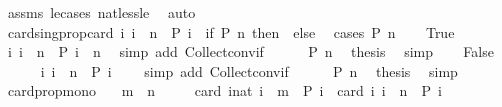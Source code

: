 \begin{isabellebody}
%
\isadelimproof
%
\endisadelimproof
%
\isatagproof
{}\isamarkupfalse%
\ assms\ le{\isacharunderscore}cases\ nat{\isacharunderscore}less{\isacharunderscore}le\ \isamarkupfalse%
\ auto%
\endisatagproof
{\isafoldproof}%
%
\isadelimproof
\isanewline
%
\endisadelimproof
\isanewline
{}\isamarkupfalse%
\ card{\isacharunderscore}sing{\isacharunderscore}prop{\isacharcolon}{\isacartoucheopen}card\ {\isacharbraceleft}i{\isachardot}\ i\ {\isacharequal}\ n\ {\isasymand}\ P\ i{\isacharbraceright}\ {\isacharequal}\ {\isacharparenleft}if\ P\ n\ then\ {}\ else\ {}{\isacharparenright}{\isacartoucheclose}\isanewline
%
\isadelimproof
%
\endisadelimproof
%
\isatagproof
{}\isamarkupfalse%
\ {\isacharparenleft}cases\ {\isacartoucheopen}P\ n{\isacartoucheclose}{\isacharparenright}\isanewline
\ \ \isamarkupfalse%
\ True\isanewline
\ \ \ \ \isamarkupfalse%
\ {\isacartoucheopen}{\isacharbraceleft}i{\isachardot}\ i\ {\isacharequal}\ n\ {\isasymand}\ P\ i{\isacharbraceright}\ {\isacharequal}\ {\isacharbraceleft}n{\isacharbraceright}{\isacartoucheclose}\ \isamarkupfalse%
\ {\isacharparenleft}simp\ add{\isacharcolon}\ Collect{\isacharunderscore}conv{\isacharunderscore}if{\isacharparenright}\isanewline
\ \ \ \ \isamarkupfalse%
\ {\isacartoucheopen}P\ n{\isacartoucheclose}\ \isamarkupfalse%
\ {\isacharquery}thesis\ \isamarkupfalse%
\ simp\isanewline
{}\isamarkupfalse%
\isanewline
\ \ \isamarkupfalse%
\ False\isanewline
\ \ \ \ \isamarkupfalse%
\ {\isacartoucheopen}{\isacharbraceleft}i{\isachardot}\ i\ {\isacharequal}\ n\ {\isasymand}\ P\ i{\isacharbraceright}\ {\isacharequal}\ {\isacharbraceleft}{\isacharbraceright}{\isacartoucheclose}\ \isamarkupfalse%
\ {\isacharparenleft}simp\ add{\isacharcolon}\ Collect{\isacharunderscore}conv{\isacharunderscore}if{\isacharparenright}\isanewline
\ \ \ \ \isamarkupfalse%
\ {\isacartoucheopen}{\isasymnot}P\ n{\isacartoucheclose}\ \isamarkupfalse%
\ {\isacharquery}thesis\ \isamarkupfalse%
\ simp\isanewline
{}\isamarkupfalse%
%
\endisatagproof
{\isafoldproof}%
%
\isadelimproof
\isanewline
%
\endisadelimproof
\isanewline
{}\isamarkupfalse%
\ card{\isacharunderscore}prop{\isacharunderscore}mono{\isacharcolon}\isanewline
\ \ \ {\isacartoucheopen}m\ {\isasymle}\ n{\isacartoucheclose}\isanewline
\ \ \ \ \ {\isacartoucheopen}card\ {\isacharbraceleft}i{\isacharcolon}{\isacharcolon}nat{\isachardot}\ i\ {\isasymle}\ m\ {\isasymand}\ P\ i{\isacharbraceright}\ {\isasymle}\ card\ {\isacharbraceleft}i{\isachardot}\ i\ {\isasymle}\ n\ {\isasymand}\ P\ i{\isacharbraceright}{\isacartoucheclose}\isanewline

\end{isabellebody}
